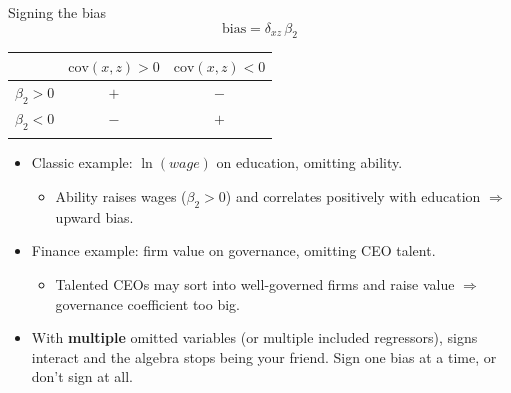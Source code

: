 \documentclass[
  11pt,
  ignorenonframetext,
  aspectratio=169,
]{beamer}
\newcounter{none} %
\providecommand{\tightlist}{%
  \setlength{\itemsep}{0pt}\setlength{\parskip}{0pt}}
\begin{document}
\begin{frame}{Signing the bias}
\protect{}\label{signing-the-bias}
\[
\text{bias} = \delta_{xz} \, \beta_2
\]

{\def\LTcaptype{none} %
\begin{longtable}[]{@{}lcc@{}}
\toprule\noalign{}
& \(\mathrm{cov}(x,z) > 0\) & \(\mathrm{cov}(x,z) < 0\) \\
\midrule\noalign{}
\endhead
\(\beta_2 > 0\) & \(+\) & \(-\) \\
\(\beta_2 < 0\) & \(-\) & \(+\) \\
\bottomrule\noalign{}
\end{longtable}
}

\begin{itemize}
\tightlist
\item
  Classic example: \(\ln(wage)\) on education, omitting ability.

  \begin{itemize}
  \tightlist
  \item
    Ability raises wages (\(\beta_2 > 0\)) and correlates positively
    with education \(\Rightarrow\) upward bias.
  \end{itemize}
\item
  Finance example: firm value on governance, omitting CEO talent.

  \begin{itemize}
  \tightlist
  \item
    Talented CEOs may sort into well-governed firms and raise value
    \(\Rightarrow\) governance coefficient too big.
  \end{itemize}
\item
  With \textbf{multiple} omitted variables (or multiple included
  regressors), signs interact and the algebra stops being your friend.
  Sign one bias at a time, or don't sign at all.
\end{itemize}
\end{frame}
\end{document}

